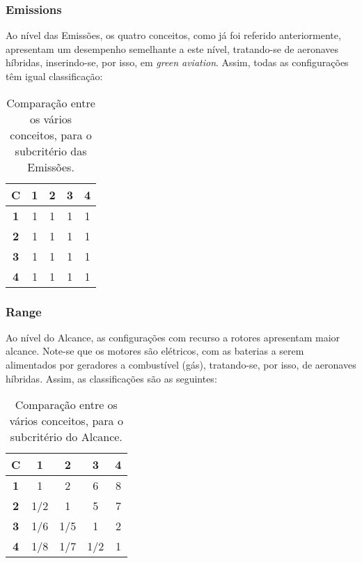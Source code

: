 \subsubsection{Emissions}

Ao nível das Emissões, os quatro conceitos, como já foi referido anteriormente, apresentam um desempenho semelhante a este nível, tratando-se de aeronaves híbridas, inserindo-se, por isso, em \textit{green aviation}. Assim, todas as configurações têm igual classificação:



\begin{table}[H]
\begin{center}
\caption{Comparação entre os vários conceitos, para o subcritério das Emissões.}
\begin{tabular}{ |c|c c c c| }
 \hline
 \textbf{C} & \textbf{1} & \textbf{2} & \textbf{3} & \textbf{4}  \\
\hline
 \textbf{1} & 1 & 1 & 1 & 1 \\
 \textbf{2} & 1 & 1 & 1 & 1  \\
 \textbf{3} & 1 & 1 & 1 & 1  \\
 \textbf{4} & 1 & 1 & 1 & 1  \\
\hline
\end{tabular}
\end{center}
\end{table}





\subsubsection{Range}

Ao nível do Alcance, as configurações com recurso a rotores apresentam maior alcance. Note-se que os motores são elétricos, com as baterias a serem alimentados por geradores a combustível (gás), tratando-se, por isso, de aeronaves híbridas. Assim, as classificações são as seguintes:



\begin{table}[H]
\begin{center}
\caption{Comparação entre os vários conceitos, para o subcritério do Alcance.}
\begin{tabular}{ |c|c c c c| }
 \hline
 \textbf{C} & \textbf{1} & \textbf{2} & \textbf{3} & \textbf{4}  \\
\hline
 \textbf{1} & 1 & 2 & 6 & 8 \\
 \textbf{2} & 1/2 & 1 & 5 & 7  \\
 \textbf{3} & 1/6 & 1/5 & 1 & 2  \\
 \textbf{4} & 1/8 & 1/7 & 1/2 & 1  \\
\hline
\end{tabular}
\end{center}
\end{table}






